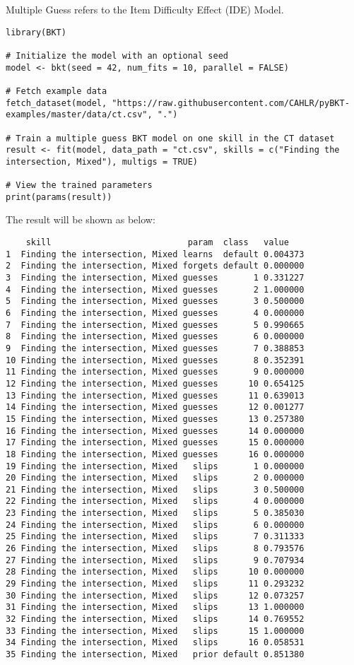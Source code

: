 \documentclass{article}
\begin{document}
Multiple Guess refers to the Item Difficulty Effect (IDE) Model.

\begin{lstlisting}[caption={R code to train an ILE BKT model}]
library(BKT)

# Initialize the model with an optional seed
model <- bkt(seed = 42, num_fits = 10, parallel = FALSE)

# Fetch example data
fetch_dataset(model, "https://raw.githubusercontent.com/CAHLR/pyBKT-examples/master/data/ct.csv", ".")

# Train a multiple guess BKT model on one skill in the CT dataset
result <- fit(model, data_path = "ct.csv", skills = c("Finding the intersection, Mixed"), multigs = TRUE)

# View the trained parameters
print(params(result))
\end{lstlisting}

The result will be shown as below:

\begin{verbatim}
    skill                           param  class   value
1  Finding the intersection, Mixed learns  default 0.004373
2  Finding the intersection, Mixed forgets default 0.000000
3  Finding the intersection, Mixed guesses       1 0.331227
4  Finding the intersection, Mixed guesses       2 1.000000
5  Finding the intersection, Mixed guesses       3 0.500000
6  Finding the intersection, Mixed guesses       4 0.000000
7  Finding the intersection, Mixed guesses       5 0.990665
8  Finding the intersection, Mixed guesses       6 0.000000
9  Finding the intersection, Mixed guesses       7 0.388853
10 Finding the intersection, Mixed guesses       8 0.352391
11 Finding the intersection, Mixed guesses       9 0.000000
12 Finding the intersection, Mixed guesses      10 0.654125
13 Finding the intersection, Mixed guesses      11 0.639013
14 Finding the intersection, Mixed guesses      12 0.001277
15 Finding the intersection, Mixed guesses      13 0.257380
16 Finding the intersection, Mixed guesses      14 0.000000
17 Finding the intersection, Mixed guesses      15 0.000000
18 Finding the intersection, Mixed guesses      16 0.000000
19 Finding the intersection, Mixed   slips       1 0.000000
20 Finding the intersection, Mixed   slips       2 0.000000
21 Finding the intersection, Mixed   slips       3 0.500000
22 Finding the intersection, Mixed   slips       4 0.000000
23 Finding the intersection, Mixed   slips       5 0.385030
24 Finding the intersection, Mixed   slips       6 0.000000
25 Finding the intersection, Mixed   slips       7 0.311333
26 Finding the intersection, Mixed   slips       8 0.793576
27 Finding the intersection, Mixed   slips       9 0.707934
28 Finding the intersection, Mixed   slips      10 0.000000
29 Finding the intersection, Mixed   slips      11 0.293232
30 Finding the intersection, Mixed   slips      12 0.073257
31 Finding the intersection, Mixed   slips      13 1.000000
32 Finding the intersection, Mixed   slips      14 0.769552
33 Finding the intersection, Mixed   slips      15 1.000000
34 Finding the intersection, Mixed   slips      16 0.058531
35 Finding the intersection, Mixed   prior default 0.851380
\end{verbatim}
    
\end{document}
